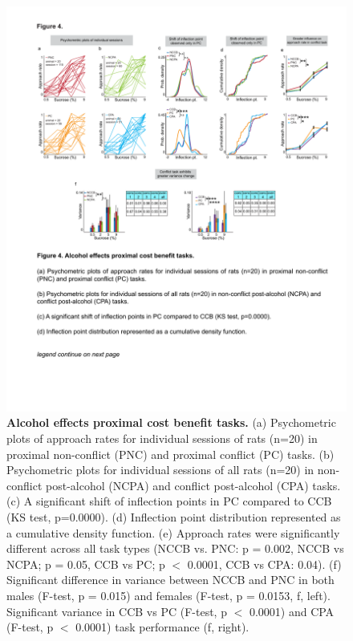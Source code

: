 \documentclass{article}
\begin{document}
\begin{figure}[H] %
  \centering
  \includegraphics[width=\textwidth, trim=50 100 50 100]{Figs/Alcohol_main_4.pdf}
  \caption{\textbf{Alcohol effects proximal cost benefit tasks.} (a) Psychometric plots of approach rates for individual sessions of rats (n=20) in proximal non-conflict (PNC) and proximal conflict (PC) tasks. (b) Psychometric plots for individual sessions of all rats (n=20) in non-conflict post-alcohol (NCPA) and conflict post-alcohol (CPA) tasks. (c) A significant shift of inflection points in PC compared to CCB (KS test, p=0.0000). (d) Inflection point distribution represented as a cumulative density function. (e) Approach rates were significantly different across all task types (NCCB vs. PNC: p = 0.002, NCCB vs NCPA; p = 0.05, CCB vs PC; p $<$ 0.0001, CCB vs CPA: 0.04). (f) Significant difference in variance between NCCB and PNC in both males (F-test, p = 0.015) and females (F-test, p = 0.0153, f, left). Significant variance in CCB vs PC (F-test, p $<$ 0.0001) and CPA (F-test, p $<$ 0.0001) task performance (f, right).}
  \label{fig:alcohol_main_4}
\end{figure}
\end{document}
